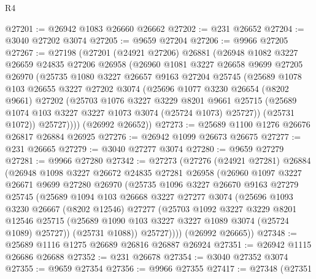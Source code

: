 \begin{lexlean}{R4}
\begin{coremodule}
@27201 := @26942 @1083 @26660 @26662
@27202 := @231 @26652
@27204 := @3040 @27202 @3074
@27205 := @9659 @27204
@27206 := @9966 @27205
@27267 := @27198
    (@27201
      (@24921 @27206)
      @26881
      (@26948
        @1082
        @3227
        @26659
        @24835
        @27206
        @26958
        (@26960
          @1081
          @3227
          @26658
          @9699
          @27205
          @26970
          (@25735
            @1080
            @3227
            @26657
            @9163
            @27204
            @25745
            (@25689
              @1078
              @103
              @26655
              @3227
              @27202
              @3074
              (@25696
                @1077
                @3230
                @26654
                (@8202 @9661)
                @27202
                (@25703
                  @1076
                  @3227
                  @3229
                  @8201
                  @9661
                  @25715
                  (@25689 @1074 @103 @3227 @3227 @1073 @3074 (@25724 @1073) @25727))
                (@25731 @1072))
              @25727))))
      (@26992 @26652))
@27273 := @25689 @1100 @1276 @26676 @26817 @26884 @26925
@27276 := @26942 @1099 @26673 @26675
@27277 := @231 @26665
@27279 := @3040 @27277 @3074
@27280 := @9659 @27279
@27281 := @9966 @27280
@27342 := @27273
    (@27276
      (@24921 @27281)
      @26884
      (@26948
        @1098
        @3227
        @26672
        @24835
        @27281
        @26958
        (@26960
          @1097
          @3227
          @26671
          @9699
          @27280
          @26970
          (@25735
            @1096
            @3227
            @26670
            @9163
            @27279
            @25745
            (@25689
              @1094
              @103
              @26668
              @3227
              @27277
              @3074
              (@25696
                @1093
                @3230
                @26667
                (@8202 @12546)
                @27277
                (@25703
                  @1092
                  @3227
                  @3229
                  @8201
                  @12546
                  @25715
                  (@25689 @1090 @103 @3227 @3227 @1089 @3074 (@25724 @1089) @25727))
                (@25731 @1088))
              @25727))))
      (@26992 @26665))
@27348 := @25689 @1116 @1275 @26689 @26816 @26887 @26924
@27351 := @26942 @1115 @26686 @26688
@27352 := @231 @26678
@27354 := @3040 @27352 @3074
@27355 := @9659 @27354
@27356 := @9966 @27355
@27417 := @27348
    (@27351

\end{coremodule}
\end{lexlean}
